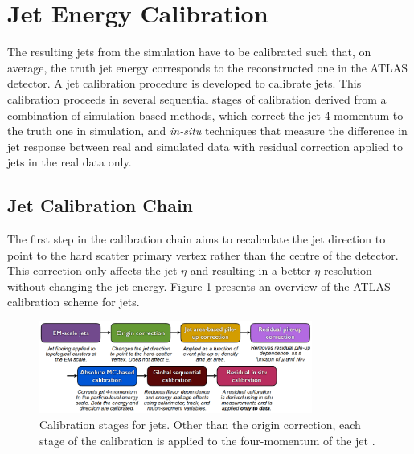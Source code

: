 \section{Jet Energy Calibration}
\label{Jet:Cal}
The resulting jets from the simulation have to be calibrated such that, on average, the truth jet energy corresponds to the reconstructed one in the ATLAS detector. A jet calibration procedure is developed to calibrate jets. This calibration proceeds in several sequential stages of calibration derived from a combination of simulation-based methods, which correct the jet 4-momentum to the truth one in simulation, and \textit{in-situ} techniques that measure the difference in jet response between real and simulated data with residual correction applied to jets in the real data only.

\subsection{Jet Calibration Chain}
\label{Jet:Cal:chain}
The first step in the calibration chain aims to recalculate the jet direction to point to the hard scatter primary vertex rather than the centre of the detector. This correction only affects the jet $\eta$ and resulting in a better $\eta$ resolution without changing the jet energy. Figure \ref{fig:Jet:Cal:chain} presents an overview of the ATLAS calibration scheme for jets.
\begin{figure}[htbp]
     \centering
     \includegraphics[width=0.8\textwidth]{Ch4/Img/calibration_chain.png}
     \caption{Calibration stages for jets. Other than the origin correction, each stage of the calibration is applied to the four-momentum of the jet \cite{JES_Sys_13_TeV}.}
     \label{fig:Jet:Cal:chain}
 \end{figure}

